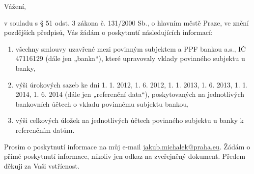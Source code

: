 \documentclass[11pt,a4paper,czech]{article}
\begin{document}

\def \yoursign {}
\def \yourdate {}
\def \oursign {ZK Pha 10/2014}
\def \place {Praha}

\printheader

\subject{Žádost o informace ohledně smluv s PPF bankou a.s.}

Vážení,

v souladu s § 51 odst. 3 zákona č. 131/2000 Sb., o hlavním městě Praze,
ve znění pozdějších předpisů, Vás žádám o poskytnutí následujících
informací:

\begin{enumerate}
\def\labelenumi{\arabic{enumi}.}
\itemsep1pt\parskip0pt
\item
  všechny smlouvy uzavřené mezi povinným subjektem a PPF bankou a.s., IČ
  47116129 (dále jen „banka``), které upravovaly vklady povinného
  subjektu u banky,
\item
  výši úrokových sazeb ke dni 1. 1. 2012, 1. 6. 2012, 1. 1. 2013, 1. 6.
  2013, 1. 1. 2014, 1. 6. 2014 (dále jen „referenční data``),
  poskytovaných na jednotlivých bankovních účtech o vkladu povinnému
  subjektu bankou,
\item
  výši celkových úložek na jednotlivých účtech povinného subjektu u
  banky k referenčním datům.
\end{enumerate}

Prosím o poskytnutí informace na můj e-mail
\url{jakub.michalek@praha.eu}. Žádám o přímé poskytnutí informace,
nikoliv jen odkaz na zveřejněný dokument. Předem děkuji za Vaši
vstřícnost.

\signature{Mgr. Bc. Jakub Michálek \\předseda klubu Pirátů \\zastupitelstvo hl. m. Prahy \\}
\end{document}
